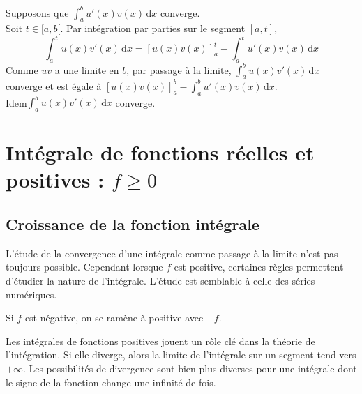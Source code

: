 \documentclass{book}
\begin{document}
\begin{Demonstration}
Supposons que $\int_a^b u'(x)v(x)\,\mathrm dx $  converge.\\
Soit $t\in[a,b[.$ Par intégration par parties sur le
segment $[a ,t]$, 
\[ \int_a^t u(x)v'(x)\,\mathrm dx = \left[u(x)v(x)\right]_a^t - \int_a^t u'(x)v(x)\,\mathrm dx \]
Comme $uv$ a une limite  en $b$, par passage à la limite, $\int_a^b u(x)v'(x)\,\mathrm dx $ converge et est égale à  $\left[u(x)v(x)\right]_a^b - \int_a^b u'(x)v(x)\,\mathrm dx$.\\
Idem$ \int_a^b u(x)v'(x)\,\mathrm dx $ converge.
\end{Demonstration}
\section{Intégrale de fonctions réelles et positives : $f\geq 0$}
\subsection{Croissance de la fonction intégrale}
L'étude de la convergence d'une intégrale comme passage à la limite n'est pas toujours possible. Cependant lorsque $f$ est positive, certaines règles
permettent d'étudier la nature de l'intégrale. L'étude est semblable à celle des séries numériques. 
\begin{Remarque}
Si $f$ est négative, on se ramène à positive avec $-f$.
\end{Remarque}
Les intégrales de fonctions positives jouent un rôle clé dans la théorie de l'intégration. Si elle diverge, alors la limite de l'intégrale sur un segment tend vers $+\infty$. 
Les possibilités de divergence sont bien plus diverses pour une intégrale dont le signe de la fonction change une infinité de fois. 
\end{document}
